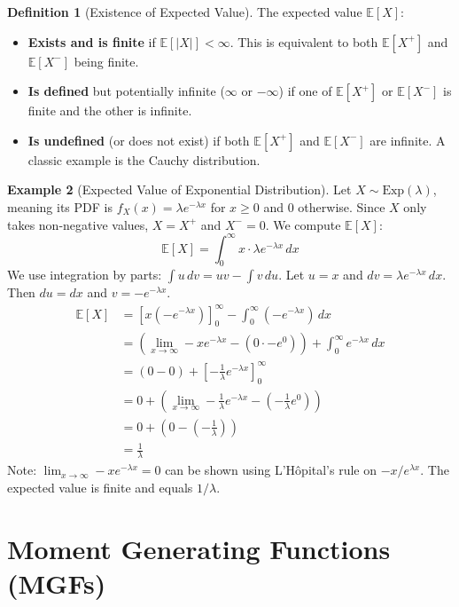 \documentclass[11pt]{article}
\theoremstyle{definition}
\newtheorem{definition}{Definition}[section]
\newtheorem{example}[definition]{Example}
\newcommand{\E}{\mathbb{E}} %
\begin{document}
\begin{definition}[Existence of Expected Value]
The expected value $\E[X]$:
\begin{itemize}
    \item \textbf{Exists and is finite} if $\E[|X|] < \infty$. This is equivalent to both $\E[X^+]$ and $\E[X^-]$ being finite.
    \item \textbf{Is defined} but potentially infinite ($\infty$ or $-\infty$) if one of $\E[X^+]$ or $\E[X^-]$ is finite and the other is infinite.
    \item \textbf{Is undefined} (or does not exist) if both $\E[X^+]$ and $\E[X^-]$ are infinite. A classic example is the Cauchy distribution.
\end{itemize}
\end{definition}

\begin{example}[Expected Value of Exponential Distribution]
Let $X \sim \text{Exp}(\lambda)$, meaning its PDF is $f_X(x) = \lambda e^{-\lambda x}$ for $x \ge 0$ and $0$ otherwise. Since $X$ only takes non-negative values, $X = X^+$ and $X^- = 0$. We compute $\E[X]$:
\[ \E[X] = \int_{0}^{\infty} x \cdot \lambda e^{-\lambda x} \, dx \]
We use integration by parts: $\int u \, dv = uv - \int v \, du$.
Let $u = x$ and $dv = \lambda e^{-\lambda x} \, dx$.
Then $du = dx$ and $v = -e^{-\lambda x}$.
\begin{align*} \E[X] &= \left[ x (-e^{-\lambda x}) \right]_0^\infty - \int_0^\infty (-e^{-\lambda x}) \, dx \\ &= \left( \lim_{x\to\infty} -x e^{-\lambda x} - (0 \cdot -e^0) \right) + \int_0^\infty e^{-\lambda x} \, dx \\ &= (0 - 0) + \left[ -\frac{1}{\lambda} e^{-\lambda x} \right]_0^\infty \\ &= 0 + \left( \lim_{x\to\infty} -\frac{1}{\lambda} e^{-\lambda x} - \left(-\frac{1}{\lambda} e^0\right) \right) \\ &= 0 + \left( 0 - \left(-\frac{1}{\lambda}\right) \right) \\ &= \frac{1}{\lambda} \end{align*}
Note: $\lim_{x\to\infty} -x e^{-\lambda x} = 0$ can be shown using L'Hôpital's rule on $-x/e^{\lambda x}$.
The expected value is finite and equals $1/\lambda$.
\end{example}


\section{Moment Generating Functions (MGFs)}
\end{document}
